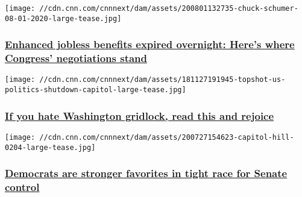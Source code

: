 \href{/2020/08/01/politics/unemployment-benefits-expire-congress-negotiations/index.html}{}

\texttt{[image: //cdn.cnn.com/cnnnext/dam/assets/200801132735-chuck-schumer-08-01-2020-large-tease.jpg]}

\hypertarget{enhanced-jobless-benefits-expired-overnight-heres-where-congress-negotiations-stand}{%
\subsubsection{\texorpdfstring{\href{/2020/08/01/politics/unemployment-benefits-expire-congress-negotiations/index.html}{Enhanced
jobless benefits expired overnight: Here's where Congress' negotiations
stand}}{Enhanced jobless benefits expired overnight: Here's where Congress' negotiations stand}}\label{enhanced-jobless-benefits-expired-overnight-heres-where-congress-negotiations-stand}}

\href{/2020/08/01/politics/what-matters-july-31/index.html}{}

\texttt{[image: //cdn.cnn.com/cnnnext/dam/assets/181127191945-topshot-us-politics-shutdown-capitol-large-tease.jpg]}

\hypertarget{if-you-hate-washington-gridlock-read-this-and-rejoice}{%
\subsubsection{\texorpdfstring{\href{/2020/08/01/politics/what-matters-july-31/index.html}{If
you hate Washington gridlock, read this and
rejoice}}{If you hate Washington gridlock, read this and rejoice}}\label{if-you-hate-washington-gridlock-read-this-and-rejoice}}

\href{/2020/08/01/politics/senate-map-analysis/index.html}{}

\texttt{[image: //cdn.cnn.com/cnnnext/dam/assets/200727154623-capitol-hill-0204-large-tease.jpg]}

\hypertarget{democrats-are-stronger-favorites-in-tight-race-for-senate-control}{%
\subsubsection{\texorpdfstring{\href{/2020/08/01/politics/senate-map-analysis/index.html}{Democrats
are stronger favorites in tight race for Senate
control}}{Democrats are stronger favorites in tight race for Senate control}}\label{democrats-are-stronger-favorites-in-tight-race-for-senate-control}}

\href{/2020/07/31/politics/house-ethics-investigation-sanford-bishop/index.html}{}

